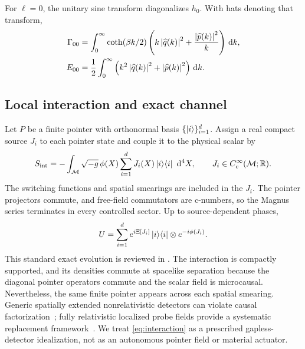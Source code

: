 For $\ell=0$, the unitary sine transform diagonalizes $h_0$.  With hats
denoting that transform,
\begin{align}
 \Gamma_{00}
 &=\int_0^\infty\coth(\beta k/2)
 \left(k\left\lvert\widehat q(k)\right\rvert^2+\frac{\left\lvert\widehat p(k)\right\rvert^2}{k}\right)\,\mathrm d k,
 \label{eq:gamma-sine}\\
 E_{00}
 &=\frac12\int_0^\infty
 \left(k^2\left\lvert\widehat q(k)\right\rvert^2+\left\lvert\widehat p(k)\right\rvert^2\right)\,\mathrm d k.
 \label{eq:energy-sine}
\end{align}

\subsection{Local interaction and exact channel}

Let $P$ be a finite pointer with orthonormal basis
$\{\left\lvert i\right\rangle\}_{i=1}^d$.  Assign a real compact source $J_i$ to each pointer
state and couple it to the physical scalar by
\begin{equation}
 S_{\rm int}=-\int_{\mathcal M}\sqrt{-g}\,\phi(X)
 \sum_{i=1}^dJ_i(X)\left\lvert i\right\rangle\!\left\langle i\right\rvert\,\,\mathrm d^4X,
 \qquad J_i\in C_c^\infty(\mathcal M;\mathbb R).
 \label{eq:interaction}
\end{equation}
The switching functions and spatial smearings are included in the $J_i$.
The pointer projectors commute, and free-field commutators are c-numbers, so
the Magnus series terminates in every controlled sector.  Up to
source-dependent phases,
\begin{equation}
 U=\sum_{i=1}^d e^{i\Xi[J_i]}\left\lvert i\right\rangle\!\left\langle i\right\rvert
 \otimes e^{-i\phi(J_i)}.
 \label{eq:exact-unitary}
\end{equation}
This standard exact evolution is reviewed in
\cite{Landulfo2016,BarcellosLandulfo2021,BatistaEtAl2026}.
The interaction is compactly supported, and its densities commute at
spacelike separation because the diagonal pointer operators commute and the
scalar field is microcausal.  Nevertheless, the same finite pointer appears
across each spatial smearing.  Generic spatially extended nonrelativistic
detectors can violate causal factorization~\cite{deRamonEtAl2021}; fully
relativistic localized probe fields provide a systematic replacement
framework~\cite{PercheEtAl2024}.  We treat \cref{eq:interaction} as a
prescribed gapless-detector idealization, not as an autonomous pointer field
or material actuator.

